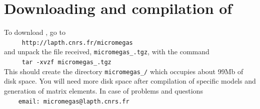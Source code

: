\documentclass[12pt,a4paper]{article}
\begin{document}
  
\section{Downloading and compilation of \micro}
To   download  \micro, go to    \\  
\verb|     http://lapth.cnrs.fr/micromegas|\\
and unpack the file received, \verb|micromegas_|\VERSION\verb|.tgz|, with the command\\
\verb|     tar -xvzf micromegas_|\VERSION\verb|.tgz|\\
This should create the directory \verb|micromegas_|\VERSION\verb|/| which occupies about 99Mb of disk space. You will need more disk space after compilation of
specific models and generation of matrix elements.
In case of problems and questions\\
\verb|    email: micromegas@lapth.cnrs.fr|\\
\end{document}

